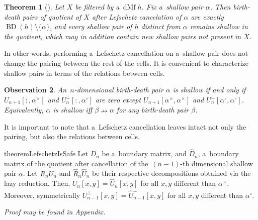 \documentclass[a4paper,12pt, USenglish,cleveref,autoref,thm-restate]{article}
\newtheorem{theorem}{Theorem}
\newtheorem{observation}[theorem]{Observation}
\newcommand{\proofappendix}{\textit{\small Proof may be found in Appendix.}}
\newcommand{\mf}{h}
\DeclareMathOperator{\bd}{BD}
\newcommand{\dmf}{\text{dMf}}
\newcommand{\mU}{U}
\newcommand{\hmU}{\mU}
\newcommand{\hmUaft}{\hat{\mU}}
\newcommand{\cmU}{\mU^{\perp}}
\newcommand{\cmUaft}{\hat{\mU}^{\perp}}
\newcommand{\mB}{D}
\newcommand{\hmB}{D}
\newcommand{\hmBaft}{\hat{\mB}}
\newcommand{\cy}{y}
\newcommand{\bth}[1]{#1^\circ}
\newcommand{\dth}[1]{#1^{\!\times}}
\newcommand{\norel}{\nrightarrow}
\newcommand{\bds}{\alpha}
\newcommand{\bdt}{\beta}
\begin{document}
\begin{theorem}[{\cite[Theorem~3.2]{EdLiMrSo2024}}]\label{thm:cancelation}
   Let $X$ be filtered by a~$\dmf \; \mf$. Fix a~shallow pair $\bds$. Then birth-death pairs of quotient of $X$ after Lefschetz cancelation of $\bds$ are exactly $\bd(\mf)\setminus \{\bds\}$, and every shallow pair of $\mf$ distinct from $\bds$
    remains shallow in the quotient, which may in addition contain new shallow pairs not present in $X$.

\end{theorem}
%
\noindent In other words, performing a~Lefschetz cancellation on a~shallow pair does not change the pairing between the rest of the cells. It is convenient to characterize shallow pairs in terms of the relations between cells.

\begin{observation}\label{obs:shallow_means_relationless}
    An~$n$-dimensional birth-death pair $\bds$ is shallow if and only if $\hmU_{n+1}[:,\dth\bds]$ and $\cmU_{n}[:,\bth\bds]$ are zero except $\hmU_{n+1}[\dth\bds,\dth\bds]$ and $\cmU_{n}[\bth\bds,\bth\bds]$. Equivalently, $\bds$ is shallow iff $\bdt \norel \bds$ for any birth-death pair $\bdt$.
 
\end{observation}

\noindent It is important to note that a~Lefschetz cancellation leaves intact not only the pairing, but also the relations between cells.


\begin{restatable}{theorem}{LefschetzIsSafe}\label{thm:lefschetz_is_safe}
    Let $\hmB_{n}$ be a~boundary matrix,  
        and $\hmBaft_{n}$, a~boundary matrix of the quotient after cancellation of the~$(n-1)$-th dimensional shallow pair $\bds$.  Let $R_{n}\hmU_{n}$ and $\hat{R}_{n}\hmUaft_{n}$ be their respective decompositions obtained via the lazy reduction. Then, $\hmU_{n}[x,y] = \hmUaft_{n}[x,y]$ for all $x,y$ different than $\dth\bds$. Moreover, symmetrically $\cmU_{n-1}[x,y] = \cmUaft_{n-1}[x,y]$ for all $x,y$ different than $\bth\bds$.
\end{restatable}

\proofappendix



\end{document}
